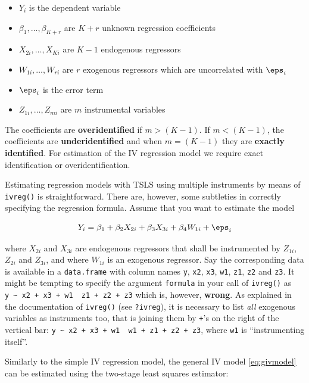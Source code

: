\documentclass[
  letterpaper,
  DIV=11,
  numbers=noendperiod]{scrreprt}
\theoremstyle{definition}
\theoremstyle{plain}
\theoremstyle{plain}
\theoremstyle{remark}
\begin{document}
{\begin{itemize}
\item $Y_i$ is the dependent variable
\item $\beta_1,\dots,\beta_{K+r}$ are $K+r$ unknown regression coefficients
\item $X_{2i},\dots,X_{Ki}$ are $K-1$ endogenous regressors 
\item $W_{1i},\dots,W_{ri}$ are $r$ exogenous regressors which are uncorrelated with $\eps_i$
\item $\eps_i$ is the error term
\item $Z_{1i},\dots,Z_{mi}$ are $m$ instrumental variables
\end{itemize}
\vspace{0.5cm}

The coefficients are \textbf{overidentified} if \(m>(K-1)\). If
\(m<(K-1)\), the coefficients are \textbf{underidentified} and when
\(m=(K-1)\) they are \textbf{exactly identified}. For estimation of the
IV regression model we require exact identification or
overidentification.

Estimating regression models with TSLS using multiple instruments by
means of \texttt{ivreg()} is straightforward. There are, however, some
subtleties in correctly specifying the regression formula. Assume that
you want to estimate the model

\[
Y_i = \beta_1 + \beta_2 X_{2i} + \beta_3 X_{3i} + \beta_4 W_{1i} + \eps_i
\]

where \(X_{2i}\) and \(X_{3i}\) are endogenous regressors that shall be
instrumented by \(Z_{1i}\), \(Z_{2i}\) and \(Z_{3i}\), and where
\(W_{1i}\) is an exogenous regressor. Say the corresponding data is
available in a \texttt{data.frame} with column names \texttt{y},
\texttt{x2}, \texttt{x3}, \texttt{w1}, \texttt{z1}, \texttt{z2} and
\texttt{z3}. It might be tempting to specify the argument
\texttt{formula} in your call of \texttt{ivreg()} as
\texttt{y\ \textasciitilde{}\ x2\ +\ x3\ +\ w1\ \textbar{}\ z1\ +\ z2\ +\ z3}
which is, however, \textbf{wrong}. As explained in the documentation of
\texttt{ivreg()} (see \texttt{?ivreg}), it is necessary to list
\emph{all} exogenous variables as instruments too, that is joining them
by \texttt{+}'s on the right of the vertical bar:
\texttt{y\ \textasciitilde{}\ x2\ +\ x3\ +\ w1\ \textbar{}\ w1\ +\ z1\ +\ z2\ +\ z3},
where \texttt{w1} is ``instrumenting itself''.

Similarly to the simple IV regression model, the general IV model
\eqref{eq:givmodel} can be estimated using the two-stage least squares
estimator:

}
\end{document}
